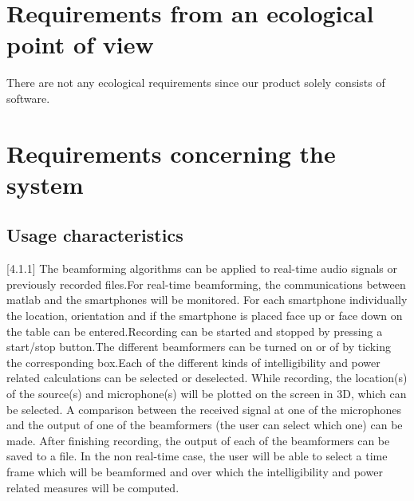 





\section{Requirements from an ecological point of view}
There are not any ecological requirements since our product solely consists of software.

\section{Requirements concerning the system}


\subsection{Usage characteristics} %
[4.1.1] The beamforming algorithms can be applied to real-time audio signals or previously recorded files.\newline
[4.1.2] For real-time beamforming, the communications between matlab and the smartphones will be monitored. \newline
[4.1.3] For each smartphone individually the location, orientation and if the smartphone is placed face up or face down on the table can be entered.\newline
[4.1.4] Recording can be started and stopped by pressing a start/stop button.\newline
[4.1.5] The different beamformers can be turned on or of by ticking the corresponding box.\newline
[4.1.6] Each of the different kinds of intelligibility and power related calculations can be selected or deselected. \newline
[4.1.7] While recording, the location(s) of the source(s) and microphone(s) will be plotted on the screen in 3D, which can be selected. \newline
[4.1.8] A comparison between the received signal at one of the microphones and the output of one of the beamformers (the user can select which one) can be made. \newline
[4.1.9] After finishing recording, the output of each of the beamformers can be saved to a file. \newline
[4.1.10] In the non real-time case, the user will be able to select a time frame which will be beamformed and over which the intelligibility and power related measures will be computed.

